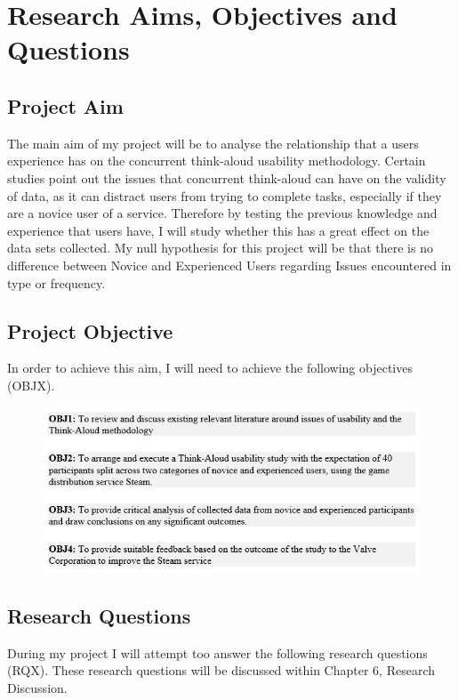 \section{Research Aims, Objectives and Questions}
\subsection{Project Aim}
The main aim of my project will be to analyse the relationship that a users experience has on the concurrent think-aloud usability methodology. Certain studies point out the issues that concurrent think-aloud can have on the validity of data, as it can distract users from trying to complete tasks, especially if they are a novice user of a service. Therefore by testing the previous knowledge and experience that users have, I will study whether this has a great effect on the data sets collected. My null hypothesis for this project will be that there is no difference between Novice and Experienced Users regarding Issues encountered in type or frequency.

\subsection{Project Objective}
In order to achieve this aim, I will need to achieve the following objectives (OBJX). 

\begin{figure}[H]
    \centering
    \includegraphics{Screenshots/projectObjectives.png}
\end{figure} 
   
   
   
    
\subsection{Research Questions}
During my project I will attempt too answer the following research questions (RQX). These research questions will be discussed within Chapter 6, Research Discussion. 

